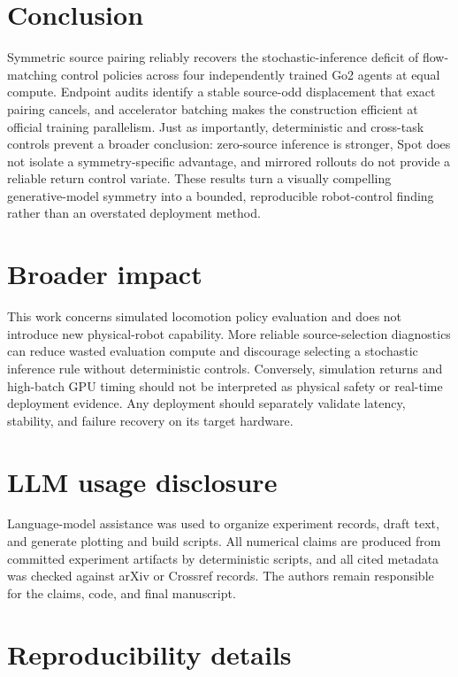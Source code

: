 \documentclass{article}
\begin{document}
\section{Conclusion}

Symmetric source pairing reliably recovers the stochastic-inference deficit of
flow-matching control policies across four independently trained Go2 agents at
equal compute. Endpoint audits identify a stable source-odd displacement that
exact pairing cancels, and accelerator batching makes the construction
efficient at official training parallelism. Just as importantly, deterministic
and cross-task controls prevent a broader conclusion: zero-source inference is
stronger, Spot does not isolate a symmetry-specific advantage, and mirrored
rollouts do not provide a reliable return control variate. These results turn
a visually compelling generative-model symmetry into a bounded, reproducible
robot-control finding rather than an overstated deployment method.

\section*{Broader impact}

This work concerns simulated locomotion policy evaluation and does not introduce
new physical-robot capability. More reliable source-selection diagnostics can
reduce wasted evaluation compute and discourage selecting a stochastic
inference rule without deterministic controls. Conversely, simulation returns
and high-batch GPU timing should not be interpreted as physical safety or
real-time deployment evidence. Any deployment should separately validate
latency, stability, and failure recovery on its target hardware.

\section*{LLM usage disclosure}

Language-model assistance was used to organize experiment records, draft text,
and generate plotting and build scripts. All numerical claims are produced from
committed experiment artifacts by deterministic scripts, and all cited metadata
was checked against arXiv or Crossref records. The authors remain responsible
for the claims, code, and final manuscript.




\appendix
\section{Reproducibility details}
\end{document}
